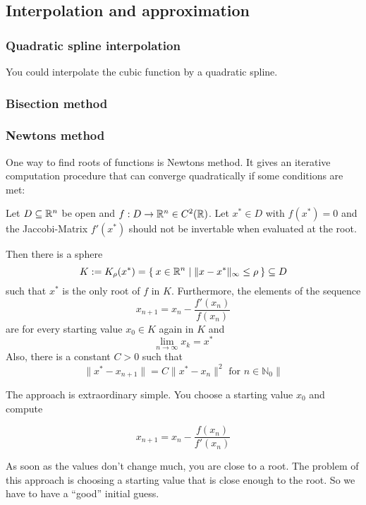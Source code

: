 \subsection{Interpolation and approximation}
\subsubsection{Quadratic spline interpolation}
You could interpolate the cubic function by a quadratic spline.

\subsubsection{Bisection method}

\subsubsection{Newtons method}
One way to find roots of functions is Newtons method. It gives an
iterative computation procedure that can converge quadratically
if some conditions are met:

\begin{theorem}
    Let $D \subseteq \mathbb{R}^n$ be open and $f: D \rightarrow \mathbb{R}^n \in C^2(\mathbb{R})$.
    Let $x^* \in D$ with $f(x^*) = 0$ and the Jaccobi-Matrix $f'(x^*)$
    should not be invertable when evaluated at the root.

    Then there is a sphere
    \[K := K_\rho(x^*) = \Set{x \in \ensuremath{\mathbb{R}}^n | \|x- x^*\|_\infty \leq \rho} \subseteq D\]
    such that $x^*$ is the only root of $f$ in $K$. Furthermore,
    the elements of the sequence
    \[ x_{n+1} = x_n - \frac{f'(x_n)}{f(x_n)}\]
    are for every starting value $x_0 \in K$ again in $K$ and
    \[\lim_{n \rightarrow \infty} x_k = x^*\]
    Also, there is a constant $C > 0$ such that
    \[\|x^* - x_{n+1} \| = C \|x^* - x_n\|^2 \text{ for } n \in \mathbb{N}_0\|\]
\end{theorem}

The approach is extraordinary simple. You choose a starting value
$x_0$ and compute

\[x_{n+1} = x_n - \frac{f(x_n)}{f'(x_n)}\]

As soon as the values don't change much, you are close to a root.
The problem of this approach is choosing a starting value that is
close enough to the root. So we have to have a \enquote{good}
initial guess.
\clearpage

